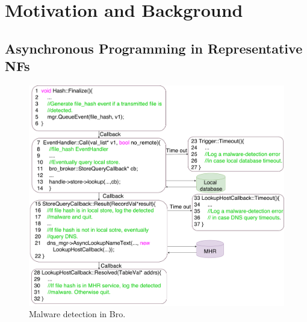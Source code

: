 \section{Motivation and Background} \label{sec:netstar-motivation} 

\subsection {Asynchronous Programming in Representative NFs}
\label{sec:bro}

\begin{figure}[!h]
\centering
\includegraphics[width=\columnwidth]{chap-netstar/figure/ids_process_loop.pdf}
\caption{Malware detection in Bro.}
\label{fig:code-sample}
\end{figure}

